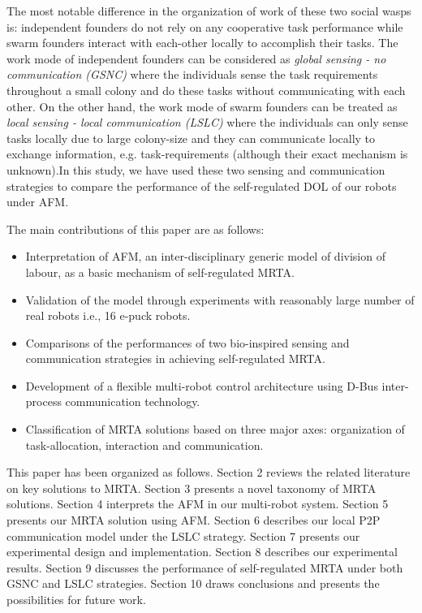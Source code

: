 \documentclass[final,5p,times,twocolumn]{elsarticle}
\begin{document}
The most notable difference in the organization of work of these two social wasps is: independent founders do not rely on any cooperative task performance while swarm founders interact with each-other locally to accomplish their tasks. The work mode of independent founders can be considered as {\em global sensing - no communication (GSNC)} where the individuals sense the task requirements throughout a small colony and do these tasks without communicating with each other. On the other hand, the work mode of swarm founders can be treated as {\em local sensing - local communication (LSLC)} where the individuals can only sense tasks locally due to large colony-size and they can communicate locally to exchange information, e.g. task-requirements (although their exact mechanism is unknown).In this study, we have used these two sensing and communication strategies to compare the performance of the self-regulated DOL of our robots under AFM. 

The main contributions of this paper are as follows:
\begin{itemize}
\item Interpretation of AFM, an inter-disciplinary generic model of division of labour, as a basic mechanism of self-regulated MRTA.
\item Validation of the model through experiments with reasonably large number of real robots i.e., 16 e-puck robots.
\item Comparisons of the performances of two bio-inspired sensing and communication strategies in achieving self-regulated MRTA.
\item Development of a flexible multi-robot control architecture using D-Bus inter-process communication technology.
\item Classification of MRTA solutions based on three major axes: organization of task-allocation, interaction and communication.
\end{itemize}
This paper has been organized as follows.
Section 2 reviews the related literature on key solutions to MRTA. Section 3 presents a novel taxonomy of MRTA solutions.
Section 4 interprets the AFM in our multi-robot system. 
Section 5 presents our MRTA solution using AFM. Section 6 describes our local P2P communication model under the LSLC strategy.
Section 7 presents our experimental design and implementation. Section 8 describes our experimental results. 
Section 9 discusses the performance of self-regulated MRTA under both GSNC and LSLC strategies.
Section 10 draws conclusions and presents the possibilities for future work.
\end{document}
